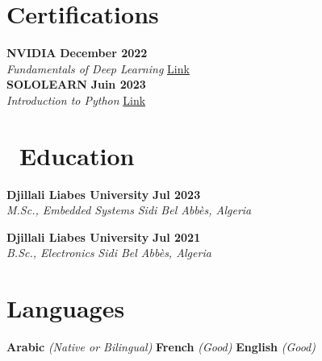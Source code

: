\documentclass[11pt,a4paper]{article}
\begin{document}
\section*{Certifications}
\textbf{NVIDIA}
\hfill
\textbf{December 2022}
\\
\hfill
\textit{Fundamentals of Deep Learning}
\href{https://courses.nvidia.com/certificates/bb284efe6de4435a9babb88a2a6b9b06/}{Link}
\\[0.8cm]
\textbf{SOLOLEARN}
\hfill
\textbf{Juin 2023}
\\
\hfill
\textit{Introduction to Python}
\href{https://www.sololearn.com/certificates/CC-OSCALKZP}{Link}



\section*{\faGraduationCap\ Education}
\textbf{Djillali Liabes University} \hfill \textbf{Jul 2023} \\
\textit{M.Sc., Embedded Systems} 
\hfill \textit{Sidi Bel Abbès, Algeria}

\textbf{Djillali Liabes University} \hfill \textbf{Jul 2021} \\
\textit{B.Sc., Electronics} 
\hfill \textit{Sidi Bel Abbès, Algeria} 



\section*{Languages}

\vspace{2em}
\hspace{6.5em}
 \textbf{Arabic} \textit{(Native or Bilingual)} \hspace{1cm} \textbf{French} \textit{(Good)} \hspace{1cm} \textbf{English} \textit{(Good)}
\end{document}
